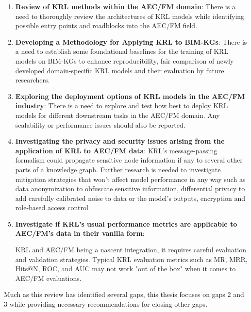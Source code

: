 \begin{enumerate}

    \item 
    \textbf{Review of \ac{KRL} methods within the \ac{AEC/FM} domain}: There is a need to thoroughly review the architectures of \ac{KRL} models while identifying possible entry points and roadblocks into the \ac{AEC/FM} field.

    \item 
    \textbf{Developing a Methodology for Applying \ac{KRL} to \acp{BIM-KG}}: There is a need to establish some foundational baselines for the training of \ac{KRL} models on \acp{BIM-KG} to enhance reproducibility, fair comparison of newly developed domain-specific \ac{KRL} models and their evaluation by future researchers. 

    \item 
    \textbf{Exploring the deployment options of \ac{KRL} models in the \ac{AEC/FM} industry}: There is a need to explore and test how best to deploy \ac{KRL} models for different downstream tasks in the \ac{AEC/FM} domain. Any scalability or performance issues should also be reported. 

    \item 
    \textbf{Investigating the privacy and security issues arising from the application of \ac{KRL} to \ac{AEC/FM} data}: \ac{KRL}'s message-passing formalism could propagate sensitive node information if any to several other parts of a knowledge graph. Further research is needed to investigate mitigation strategies that won't affect model performance in any way such as data anonymization to obfuscate sensitive information, differential privacy to add carefully calibrated noise to data or the model's outputs, encryption and role-based access control  
    

    \item
    \textbf{Investigate if \ac{KRL}'s usual performance metrics are applicable to \ac{AEC/FM}'s data in their vanilla form}: 
    
    \ac{KRL} and \ac{AEC/FM} being a nascent integration, it requires careful evaluation and validation strategies. Typical \ac{KRL} evaluation metrics such as
    \ac{MR}, \ac{MRR}, Hits@N, \ac{ROC}, and \ac{AUC} may not work "out of the box" when it comes to \ac{AEC/FM} evaluations.
\end{enumerate}

\noindent Much as this review has identified several gaps, this thesis focuses on gaps 2 and 3 while providing necessary recommendations for closing other gaps.














